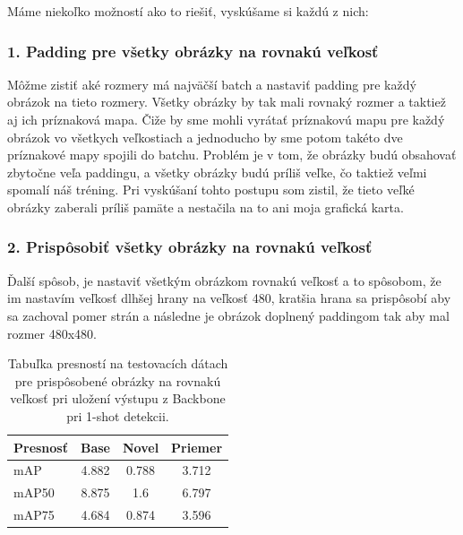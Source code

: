 Máme niekoľko možností ako to riešiť, vyskúšame si každú z nich: 

\subsubsection{1. Padding pre všetky obrázky na rovnakú veľkosť}

Môžme zistiť aké rozmery má najväčší batch a nastaviť padding pre každý obrázok na tieto rozmery. Všetky obrázky by tak mali rovnaký rozmer a taktiež aj ich príznaková mapa. Čiže by sme mohli vyrátať príznakovú mapu pre každý obrázok vo všetkych veľkostiach a jednoducho by sme potom takéto dve príznakové mapy spojili do batchu. Problém je v tom, že obrázky budú obsahovať zbytočne veľa paddingu, a všetky obrázky budú príliš veľke, čo taktiež veľmi spomalí náš tréning. Pri vyskúšaní tohto postupu som zistil, že tieto veľké obrázky zaberali príliš pamäte a nestačila na to ani moja grafická karta.

\subsubsection{2. Prispôsobiť všetky obrázky na rovnakú veľkosť}

Ďalší spôsob, je nastaviť všetkým obrázkom rovnakú veľkosť a to spôsobom, že im nastavím veľkosť dlhšej hrany na veľkosť 480, kratšia hrana sa prispôsobí aby sa zachoval pomer strán a následne je obrázok doplnený paddingom tak aby mal rozmer 480x480.

\begin{table}[ht]
\begin{tabular}{|l|c|c|c|}
\hline
\textbf{Presnosť} & \textbf{Base} & \textbf{Novel} & \textbf{Priemer} \\
\hline
mAP & 4.882 & 0.788 & 3.712 \\
mAP50 & 8.875 & 1.6 & 6.797 \\
mAP75 & 4.684 & 0.874 & 3.596 \\
\hline
\end{tabular}
\centering
\caption{Tabuľka presností na testovacích dátach pre prispôsobené obrázky na rovnakú veľkosť pri uložení výstupu z Backbone pri 1-shot detekcii.}
\label{tab:table52}
\end{table}

